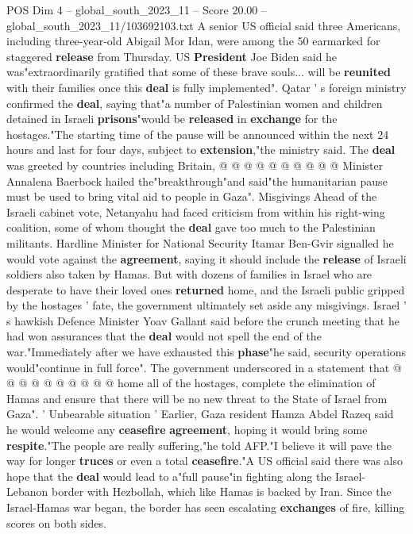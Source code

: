 \begin{textsample}{POS Dim 4 – global\_south\_2023\_11 – Score 20.00 – global\_south\_2023\_11/103692103.txt}
A senior US official said three Americans, including three-year-old Abigail Mor Idan, were among the 50 earmarked for staggered \textbf{release} from Thursday.
US \textbf{President} Joe Biden said he was"extraordinarily gratified that some of these brave souls... will be \textbf{reunited} with their families once this \textbf{deal} is fully implemented".
Qatar ' s foreign ministry confirmed the \textbf{deal}, saying that"a number of Palestinian women and children detained in Israeli \textbf{prisons}"would be \textbf{released} in \textbf{exchange} for the hostages."The starting time of the pause will be announced within the next 24 hours and last for four days, subject to \textbf{extension},"the ministry said.
The \textbf{deal} was greeted by countries including Britain, @ @ @ @ @ @ @ @ @ @ Minister Annalena Baerbock hailed the"breakthrough"and said"the humanitarian pause must be used to bring vital aid to people in Gaza".
Misgivings Ahead of the Israeli cabinet vote, Netanyahu had faced criticism from within his right-wing coalition, some of whom thought the \textbf{deal} gave too much to the Palestinian militants.
Hardline Minister for National Security Itamar Ben-Gvir signalled he would vote against the \textbf{agreement}, saying it should include the \textbf{release} of Israeli soldiers also taken by Hamas.
But with dozens of families in Israel who are desperate to have their loved ones \textbf{returned} home, and the Israeli public gripped by the hostages ' fate, the government ultimately set aside any misgivings.
Israel ' s hawkish Defence Minister Yoav Gallant said before the crunch meeting that he had won assurances that the \textbf{deal} would not spell the end of the war."Immediately after we have exhausted this \textbf{phase}"he said, security operations would"continue in full force".
The government underscored in a statement that @ @ @ @ @ @ @ @ @ @ home all of the hostages, complete the elimination of Hamas and ensure that there will be no new threat to the State of Israel from Gaza". ' Unbearable situation ' Earlier, Gaza resident Hamza Abdel Razeq said he would welcome any \textbf{ceasefire} \textbf{agreement}, hoping it would bring some \textbf{respite}."The people are really suffering,"he told AFP."I believe it will pave the way for longer \textbf{truces} or even a total \textbf{ceasefire}."A US official said there was also hope that the \textbf{deal} would lead to a"full pause"in fighting along the Israel-Lebanon border with Hezbollah, which like Hamas is backed by Iran.
Since the Israel-Hamas war began, the border has seen escalating \textbf{exchanges} of fire, killing scores on both sides.

\end{textsample}
